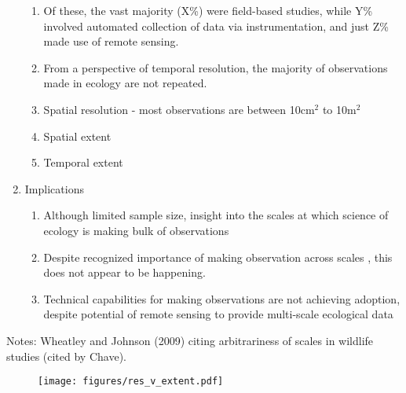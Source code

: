 \documentclass[12pt]{article}
\newcounter{lastnote}
\begin{document}
\begin{enumerate}
\begin{enumerate}
    \item  Of these, the vast majority (X\%) were field-based studies, while Y\% involved automated collection of data via instrumentation, and just Z\% made use of remote sensing.   
    \item From a perspective of temporal resolution, the majority of observations made in ecology are not repeated.
    \item Spatial resolution - most observations are between 10cm$^2$ to 10m$^2$
    \item Spatial extent
    \item Temporal extent
   \end{enumerate}
   \item{Implications} 
   \begin{enumerate}
    \item Although limited sample size, insight into the scales at which science of ecology is making bulk of observations
    \item Despite recognized importance of making observation across scales \cite{levin_problem_1992}, this does not appear to be happening. 
    \item Technical capabilities for making observations are not achieving adoption, despite potential of remote sensing to provide multi-scale ecological data \cite{estes_predictive_2011,estes_habitat_2008} 
   \end{enumerate}

\end{enumerate}

Notes: Wheatley and Johnson (2009) citing arbitrariness of scales in wildlife studies (cited by Chave). 

\begin{figure}[!ht]
\texttt{[image: figures/res\_v\_extent.pdf]}
\vspace{-0.15 cm}
\caption{}
\label{afoto1}
\end{figure}








\end{document}
